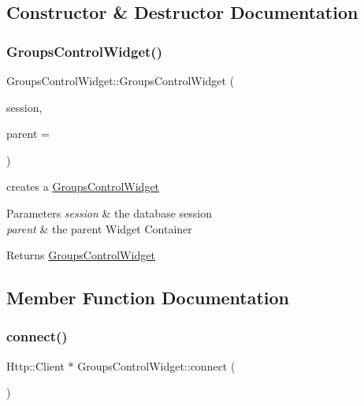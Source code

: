 \subsection{Constructor \& Destructor Documentation}
\mbox{\label{class_groups_control_widget_a4d6a0e40f6968c53e163c167612932d4}} 
\subsubsection{\texorpdfstring{Groups\+Control\+Widget()}{GroupsControlWidget()}}
{\footnotesize\ttfamily Groups\+Control\+Widget\+::\+Groups\+Control\+Widget (\begin{DoxyParamCaption}\item[{\hyperlink{class_session}{Session} $\ast$}]{session,  }\item[{Wt\+::\+W\+Container\+Widget $\ast$}]{parent = {} }\end{DoxyParamCaption})}



creates a \hyperlink{class_groups_control_widget}{Groups\+Control\+Widget} 


\begin{DoxyParams}{Parameters}
{\em session} & the database session \\
\hline
{\em parent} & the parent Widget Container \\
\hline
\end{DoxyParams}
\begin{DoxyReturn}{Returns}
\hyperlink{class_groups_control_widget}{Groups\+Control\+Widget} 
\end{DoxyReturn}


\subsection{Member Function Documentation}
\mbox{\label{class_groups_control_widget_ac6dc70e7eccf6d30701c15d625424c0c}} 
\subsubsection{\texorpdfstring{connect()}{connect()}}
{\footnotesize\ttfamily Http\+::\+Client $\ast$ Groups\+Control\+Widget\+::connect (\begin{DoxyParamCaption}{ }\end{DoxyParamCaption})\hspace{0.3cm}{\ttfamily [private]}}



